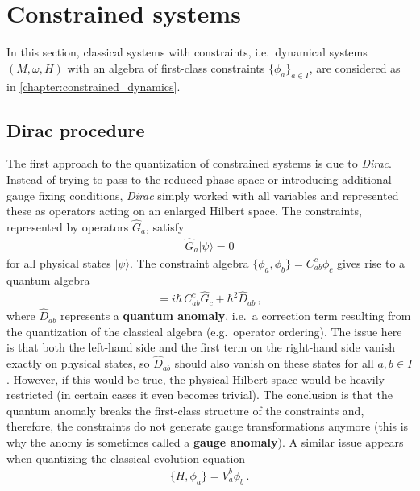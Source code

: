 
\section{Constrained systems}\label{section:quantum_constrained}

    In this section, classical systems with constraints, i.e.~dynamical systems $(M,\omega,H)$ with an algebra of first-class constraints $\{\phi_a\}_{a\in I}$, are considered as in \cref{chapter:constrained_dynamics}.

\subsection{Dirac procedure}

    The first approach to the quantization of constrained systems is due to \textit{Dirac}. Instead of trying to pass to the reduced phase space or introducing additional gauge fixing conditions, \textit{Dirac} simply worked with all variables and represented these as operators acting on an enlarged Hilbert space. The constraints, represented by operators $\widehat{G}_a$, satisfy
    \begin{gather}
        \widehat{G}_a|\psi\rangle=0
    \end{gather}
    for all physical states $|\psi\rangle$. The constraint algebra $\{\phi_a,\phi_b\} = C^c_{ab}\phi_c$ gives rise to a quantum algebra
    \begin{gather}
        [\widehat{G}_a,\widehat{G}_b] = i\hbar\,C^c_{ab}\widehat{G}_c + \hbar^2\widehat{D}_{ab}\,,
    \end{gather}
    where $\widehat{D}_{ab}$ represents a \textbf{quantum anomaly}, i.e.~a correction term resulting from the quantization of the classical algebra (e.g.~operator ordering). The issue here is that both the left-hand side and the first term on the right-hand side vanish exactly on physical states, so $\widehat{D}_{ab}$ should also vanish on these states for all $a,b\in I$. However, if this would be true, the physical Hilbert space would be heavily restricted (in certain cases it even becomes trivial). The conclusion is that the quantum anomaly breaks the first-class structure of the constraints and, therefore, the constraints do not generate gauge transformations anymore (this is why the anomy is sometimes called a \textbf{gauge anomaly}). A similar issue appears when quantizing the classical evolution equation
    \begin{gather}
        \{H,\phi_a\} = V_a^b\phi_b\,.
    \end{gather}

